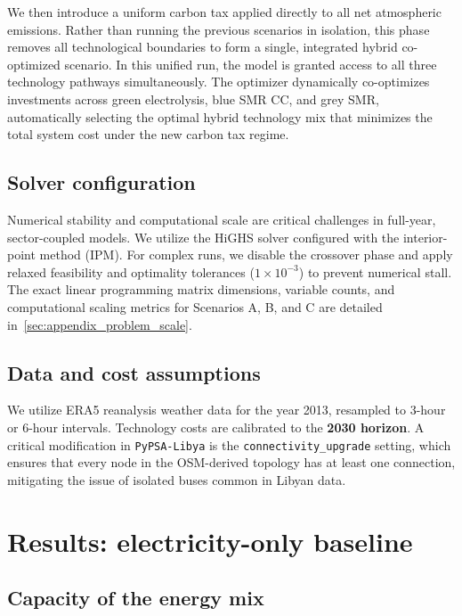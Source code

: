 \documentclass[preprint,12pt]{elsarticle}
\begin{document}
We then introduce a uniform carbon tax applied directly to all net atmospheric emissions. Rather than running the previous scenarios in isolation, this phase removes all technological boundaries to form a single, integrated hybrid co-optimized scenario. In this unified run, the model is granted access to all three technology pathways simultaneously. The optimizer dynamically co-optimizes investments across green electrolysis, blue SMR CC, and grey SMR, automatically selecting the optimal hybrid technology mix that minimizes the total system cost under the new carbon tax regime.



\subsection{Solver configuration}
Numerical stability and computational scale are critical challenges in full-year, sector-coupled models. We utilize the HiGHS solver configured with the interior-point method (IPM). For complex runs, we disable the crossover phase and apply relaxed feasibility and optimality tolerances ($1 \times 10^{-3}$) to prevent numerical stall. The exact linear programming matrix dimensions, variable counts, and computational scaling metrics for Scenarios A, B, and C are detailed in~\ref{sec:appendix_problem_scale}.

\subsection{Data and cost assumptions}
We utilize ERA5 reanalysis weather data for the year 2013, resampled to 3-hour or 6-hour intervals. Technology costs are calibrated to the \textbf{2030 horizon}. A critical modification in \texttt{PyPSA-Libya} is the \texttt{connectivity\_upgrade} setting, which ensures that every node in the OSM-derived topology has at least one connection, mitigating the issue of isolated buses common in Libyan data.


\section{Results: electricity-only baseline}

\subsection{Capacity of the energy mix}
\end{document}
